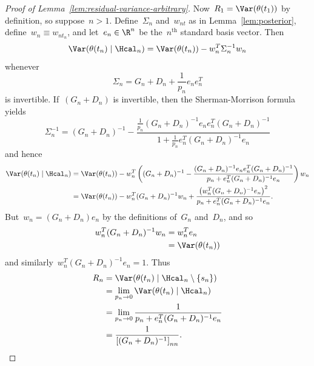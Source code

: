 \begin{proof}[Proof of Lemma~\ref{lem:residual-variance-arbitrary}]
    Now~$R_1=\Var(\theta(t_1))$ by definition, so suppose~$n>1$.
    Define~$\Sigma_n$ and~$w_{nt}$ as in Lemma~\ref{lem:posterior}, define~$w_n\equiv w_{nt_n}$, and let~$e_n\in\R^n$ be the~$n^\text{th}$ standard basis vector.
    Then
    \[ \Var(\theta(t_n)\mid\Hcal_n)=\Var(\theta(t_n))-w_n^T\Sigma_n^{-1}w_n \]
    whenever
    \[ \Sigma_n=G_n+D_n+\frac{1}{p_n}e_ne_n^T \]
    is invertible.
    If~$(G_n+D_n)$ is invertible, then the Sherman-Morrison formula \citep{Bartlett-1951-AoMS} yields
    \[ \Sigma_n^{-1}=(G_n+D_n)^{-1}-\frac{\frac{1}{p_n}(G_n+D_n)^{-1}e_ne_n^T(G_n+D_n)^{-1}}{1+\frac{1}{p_n}e_n^T(G_n+D_n)^{-1}e_n} \]
    and hence
    \begin{align*}
        \Var(\theta(t_n)\mid\Hcal_n)
        &= \Var(\theta(t_n))-w_n^T\left((G_n+D_n)^{-1}-\frac{(G_n+D_n)^{-1}e_ne_n^T(G_n+D_n)^{-1}}{p_n+e_n^T(G_n+D_n)^{-1}e_n}\right)w_n \\
        &= \Var(\theta(t_n))-w_n^T(G_n+D_n)^{-1}w_n+\frac{\left(w_n^T(G_n+D_n)^{-1}e_n\right)^2}{p_n+e_n^T(G_n+D_n)^{-1}e_n}.
    \end{align*}
    But~$w_n=(G_n+D_n)e_n$ by the definitions of~$G_n$ and~$D_n$, and so
    \begin{align*}
        w_n^T(G_n+D_n)^{-1}w_n
        &= w_n^Te_n \\
        &= \Var(\theta(t_n))
    \end{align*}
    and similarly~$w_n^T(G_n+D_n)^{-1}e_n=1$.
    Thus
    \begin{align*}
        R_n
        &= \Var(\theta(t_n)\mid\Hcal_n\setminus\{s_n\}) \\
        &= \lim_{p_n\to0}\Var(\theta(t_n)\mid\Hcal_n) \\
        &= \lim_{p_n\to0}\frac{1}{p_n+e_n^T(G_n+D_n)^{-1}e_n} \\
        &= \frac{1}{\left[(G_n+D_n)^{-1}\right]_{nn}}.\qedhere
    \end{align*}
\end{proof}
